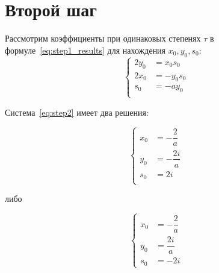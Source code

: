 \section{Второй шаг}

Рассмотрим коэффициенты при одинаковых степенях $ \tau $ в
формуле~\ref{eq:step1_results} для нахождения $ x_0, y_0, s_0 $:
\begin{equation}
  \label{eq:step2}
  \left\{
    \begin{aligned}
      2y_0 &= x_0 s_0 \\
      2x_0 &= -y_0 s_0 \\
      s_0 &= -ay_0 \\
    \end{aligned}
  \right.
\end{equation}

Система~\ref{eq:step2} имеет два решения:
\vspace{0.5em}

\begin{minipage}[h!]{0.35\linewidth}
  \begin{equation}
    \label{eq:step2_a}
    \left\{
      \begin{aligned}
        x_0 &= - \dfrac{2}{a} \\
        y_0 &= -\dfrac{2i}{a} \\
        s_0 &= 2i \\
      \end{aligned}
    \right.
  \end{equation}
\end{minipage}
\hfill
либо
\hfill
\begin{minipage}[h!]{0.35\linewidth}
  \begin{equation}
    \label{eq:step2_b}
    \left\{
      \begin{aligned}
        x_0 &= - \dfrac{2}{a} \\
        y_0 &= \dfrac{2i}{a} \\
        s_0 &= - 2i
      \end{aligned}
    \right.
  \end{equation}
\end{minipage}

\pagebreak